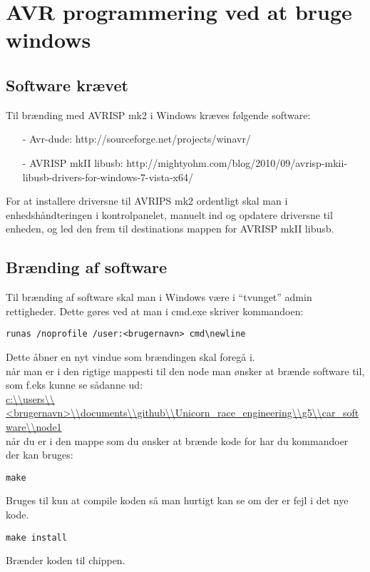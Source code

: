 \section{AVR programmering ved at bruge windows}
\subsection{Software krævet}
Til brænding med AVRISP mk2 i Windows kræves følgende software:
\begin{enumerate}
	\item[-]{Avr-dude:				http://sourceforge.net/projects/winavr/}
	\item[-]{AVRISP mkII libusb:	http://mightyohm.com/blog/2010/09/avrisp-mkii-libusb-drivers-for-windows-7-vista-x64/}
\end{enumerate}

For at installere driversne til AVRIPS mk2 ordentligt skal man i enhedshåndteringen i kontrolpanelet, manuelt ind og opdatere driversne til enheden, og led den frem til destinations mappen for AVRISP mkII libusb.

\subsection{Brænding af software}
Til brænding af software skal man i Windows være i ``tvunget'' admin rettigheder.
\newline
Dette gøres ved at man i cmd.exe skriver kommandoen:
\begin{lstlisting}
runas /noprofile /user:<brugernavn> cmd\newline
\end{lstlisting}
Dette åbner en nyt vindue som brændingen skal foregå i.\\
når man er i den rigtige mappesti til den node man ønsker at brænde software til, som f.eks kunne se sådanne ud:\\
\url{c:\\users\\<brugernavn>\\documents\\github\\Unicorn_race_engineering\\g5\\car_software\\node1} \\
når du er i den mappe som du ønsker at brænde kode for har du kommandoer der kan bruges:
\begin{lstlisting}
make
\end{lstlisting}
Bruges til kun at compile koden så man hurtigt kan se om der er fejl i det nye kode.
\begin{lstlisting}
make install
\end{lstlisting}
Brænder koden til chippen.
